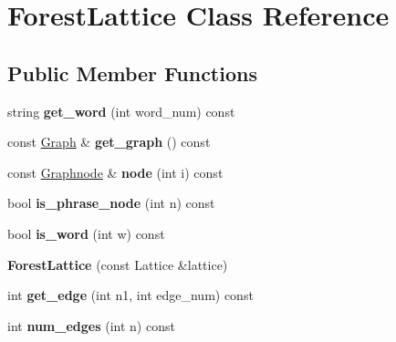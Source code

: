 \hypertarget{class_forest_lattice}{
\section{ForestLattice Class Reference}
\label{class_forest_lattice}
}
\subsection*{Public Member Functions}
\begin{DoxyCompactItemize}
\item 
\hypertarget{class_forest_lattice_ad14bc799ac36b716c292f410e1609462}{
string {\bfseries get\_\-word} (int word\_\-num) const }
\label{class_forest_lattice_ad14bc799ac36b716c292f410e1609462}

\item 
\hypertarget{class_forest_lattice_a8303ce943210d4a62132f1e4054b7191}{
const \hyperlink{class_scarab_1_1_graph_1_1_graph}{Graph} \& {\bfseries get\_\-graph} () const }
\label{class_forest_lattice_a8303ce943210d4a62132f1e4054b7191}

\item 
\hypertarget{class_forest_lattice_a744558d8489b4428c44275f0966d587e}{
const \hyperlink{class_scarab_1_1_graph_1_1_graphnode}{Graphnode} \& {\bfseries node} (int i) const }
\label{class_forest_lattice_a744558d8489b4428c44275f0966d587e}

\item 
\hypertarget{class_forest_lattice_a8afba92a7fb437a93db30b2336ad3824}{
bool {\bfseries is\_\-phrase\_\-node} (int n) const }
\label{class_forest_lattice_a8afba92a7fb437a93db30b2336ad3824}

\item 
\hypertarget{class_forest_lattice_a9d82493dff97186334923b582999f63c}{
bool {\bfseries is\_\-word} (int w) const }
\label{class_forest_lattice_a9d82493dff97186334923b582999f63c}

\item 
\hypertarget{class_forest_lattice_a9ecaabd3e59148b28b3fad096806f9e9}{
{\bfseries ForestLattice} (const Lattice \&lattice)}
\label{class_forest_lattice_a9ecaabd3e59148b28b3fad096806f9e9}

\item 
\hypertarget{class_forest_lattice_a981af70e7207ece0e3454251b64fb6fa}{
int {\bfseries get\_\-edge} (int n1, int edge\_\-num) const }
\label{class_forest_lattice_a981af70e7207ece0e3454251b64fb6fa}

\item 
\hypertarget{class_forest_lattice_a142184cf6e8d4275923774edbca97f5d}{
int {\bfseries num\_\-edges} (int n) const }
\label{class_forest_lattice_a142184cf6e8d4275923774edbca97f5d}


\end{DoxyCompactItemize}
